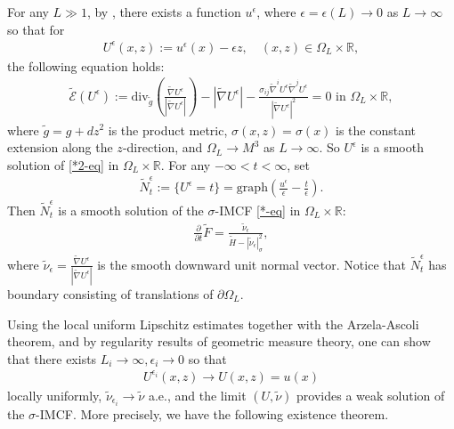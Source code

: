 \documentclass[11pt,letterpaper]{amsart}
\theoremstyle{definition}
\theoremstyle{remark}
\begin{document}
For any $L \gg 1$, by \cite[Lemma 4.1]{Dong26SigmaIMCF}, there exists a function $u ^{\epsilon }$, where $\epsilon = \epsilon (L) \to 0$ as $L\to \infty$ so that for
\begin{align}
	U ^{\epsilon }(x,z):= u ^{\epsilon }(x) - \epsilon z,\quad (x,z) \in \Omega _{L} \times \mathbb{R},
\end{align}
the following equation holds:
\begin{align}
	\tilde{\mathcal{E}}(U^{\epsilon }):= \mathrm{div}_{\tilde{g}}\left( \frac{\tilde{\nabla } U^{\epsilon }}{|\tilde{\nabla } U^{\epsilon }|} \right) - |\tilde{\nabla }U ^{\epsilon }| - \frac{\sigma _{ij} \tilde{\nabla }^{i} U^{\epsilon } \tilde{\nabla }^{j} U^{\epsilon }}{|\tilde{\nabla }U^{\epsilon }|^2} = 0 \text{ in } \Omega _{L} \times \mathbb{R},
\end{align}
where $\tilde{g}= g + dz ^2$ is the product metric, $\sigma (x,z) = \sigma (x)$ is the constant extension along the $z$-direction, and $\Omega _{L} \to M^3$ as $L\to \infty$. So $U^{\epsilon }$ is a smooth solution of \ref{*2-eq} in $\Omega _{L} \times \mathbb{R}$.  For any $-\infty< t< \infty$, set
\begin{align*}
	\tilde{N}^{\epsilon }_t := \{ U^{\epsilon }= t\} = \mathrm{graph} \left( \frac{u^{\epsilon }}{\epsilon } - \frac{t}{\epsilon } \right) .
\end{align*} 
Then $\tilde{N}^{\epsilon }_{t}$ is a smooth solution of the $\sigma $-IMCF \ref{*-eq} in $\Omega _{L} \times \mathbb{R}$:
\begin{align*}
	\frac{\partial }{\partial t} \tilde{F} = \frac{\tilde{\nu }_{\epsilon }}{\tilde{H} - |\tilde{\nu }_{\epsilon }|^2_{\sigma }},
\end{align*}
where $\tilde{\nu }_{\epsilon } = \frac{\tilde{\nabla }U^{\epsilon }}{|\tilde{\nabla }U^{\epsilon }|}$ is the smooth downward unit normal vector. 
Notice that $\tilde{N}^{\epsilon }_{t}$ has boundary consisting of translations of $\partial \Omega _{L}$. 

Using the local uniform Lipschitz estimates together with the Arzela-Ascoli theorem, and by regularity results of geometric measure theory, one can show that there exists $L_i \to \infty, \epsilon _i \to 0$ so that
\begin{align*}
	U ^{\epsilon _i}(x,z) \to U(x,z) = u(x)
\end{align*} 
locally uniformly, $\tilde{\nu }_{\epsilon _i} \to \tilde{\nu }$ a.e., and the limit $(U, \tilde{\nu })$ provides a weak solution of the $\sigma $-IMCF. More precisely, we have the following existence theorem.
\end{document}
